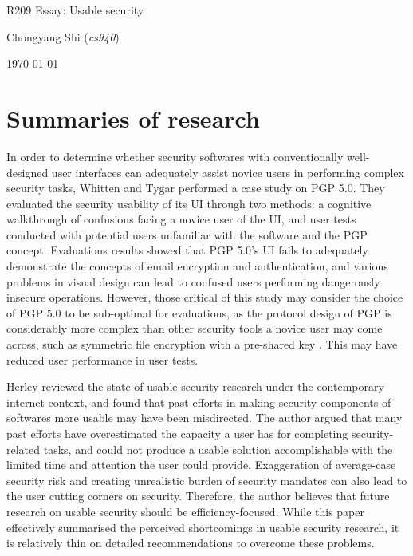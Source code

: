 \documentclass[11pt]{article}
\begin{document}
\centerline{\Large R209 Essay:  Usable security}
\vspace{2em}
\centerline{\large Chongyang Shi (\emph{cs940})}
\vspace{1em}
\centerline{\large \today}
\vspace{1em}

\section{Summaries of research}

In order to determine whether security softwares with conventionally well-designed user interfaces can adequately assist novice users in performing complex security tasks, Whitten and Tygar \cite{whitten1999johnny} performed a case study on PGP 5.0. They evaluated the security usability of its UI through two methods: a cognitive walkthrough of confusions facing a novice user of the UI, and user tests conducted with potential users unfamiliar with the software and the PGP concept. Evaluations results showed that PGP 5.0's UI fails to adequately demonstrate the concepts of email encryption and authentication, and various problems in visual design can lead to confused users performing dangerously insecure operations. However, those critical of this study may consider the choice of PGP 5.0 to be sub-optimal for evaluations, as the protocol design of PGP is considerably more complex than other security tools a novice user may come across, such as symmetric file encryption with a pre-shared key \cite{gujrati2013usability}. This may have reduced user performance in user tests.

Herley \cite{herley2014more} reviewed the state of usable security research under the contemporary internet context, and found that past efforts in making security components of softwares more usable may have been misdirected. The author argued that many past efforts have overestimated the capacity a user has for completing security-related tasks, and could not produce a usable solution accomplishable with the limited time and attention the user could provide. Exaggeration of average-case security risk \cite[2.3]{herley2014more} and creating unrealistic burden of security mandates \cite[1.3]{herley2014more} can also lead to the user cutting corners on security. Therefore, the author believes that future research on usable security should be efficiency-focused. While this paper effectively summarised the perceived shortcomings in usable security research, it is relatively thin on detailed recommendations to overcome these problems.
\end{document}
